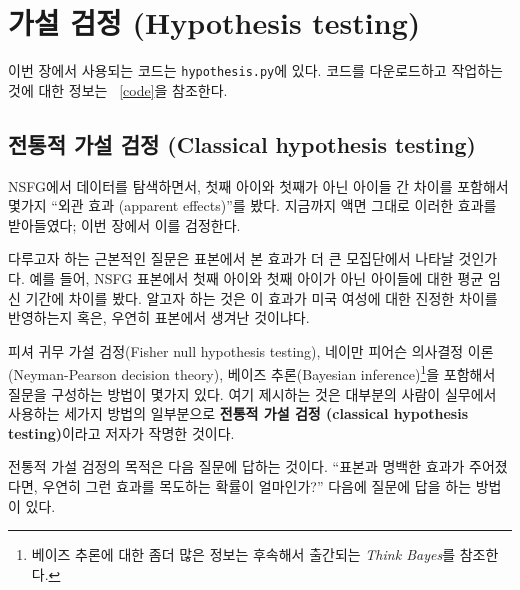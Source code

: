 

\chapter{가설 검정 (Hypothesis testing)}
\label{testing}

이번 장에서 사용되는 코드는 {\tt hypothesis.py}에 있다.
코드를 다운로드하고 작업하는 것에 대한 정보는 ~\ref{code}을 참조한다.


\section{전통적 가설 검정 (Classical hypothesis testing)}

NSFG에서 데이터를 탐색하면서, 첫째 아이와 첫째가 아닌 아이들 간 차이를 
포함해서 몇가지 ``외관 효과 (apparent effects)''를 봤다.
지금까지 액면 그대로 이러한 효과를 받아들였다; 이번 장에서 이를 검정한다. 


다루고자 하는 근본적인 질문은 표본에서 본 효과가 더 큰 모집단에서 나타날 것인가다.
예를 들어, NSFG 표본에서 첫째 아이와 첫째 아이가 아닌 아이들에 대한 평균 임신 기간에
차이를 봤다. 알고자 하는 것은 이 효과가 미국 여성에 대한 진정한 차이를 반영하는지 
혹은, 우연히 표본에서 생겨난 것이냐다.

피셔 귀무 가설 검정(Fisher null hypothesis testing), 네이만 피어슨 의사결정 이론(Neyman-Pearson decision theory), 베이즈 추론(Bayesian inference)\footnote{베이즈 추론에 대한 좀더 많은 정보는 후속해서 출간되는 {\it Think Bayes}를 참조한다.}을 포함해서 질문을 구성하는 방법이 몇가지 있다.
여기 제시하는 것은 대부분의 사람이 실무에서 사용하는 세가지 방법의 일부분으로 {\bf 전통적 가설 검정 (classical hypothesis testing)}이라고 저자가 작명한 것이다.

전통적 가설 검정의 목적은 다음 질문에 답하는 것이다.
``표본과 명백한 효과가 주어졌다면, 우연히 그런 효과를 목도하는 확률이 얼마인가?''
다음에 질문에 답을 하는 방법이 있다.

